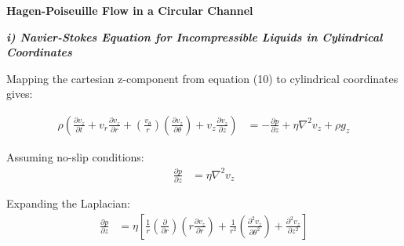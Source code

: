 \documentclass[titlepage]{article}
\begin{document}
\newpage
\begin{center}
    \large
    \textbf{Hagen-Poiseuille Flow in a Circular Channel} \\
\end{center}

\normalsize
\begin{center}
    \textbf{\emph{i) Navier-Stokes Equation for Incompressible Liquids in Cylindrical Coordinates}}
\end{center}

\noindent Mapping the cartesian z-component from equation (10) to cylindrical coordinates gives: 

\begin{align}
    \rho\left(\displaystyle\frac{\partial{v_{z}}}{\partial{t}}+v_{r}\displaystyle\frac{\partial{v_{z}}}{\partial{r}}+\left(\displaystyle\frac{v_{\theta}}{r}\right)\left(\displaystyle\frac{\partial{v_{z}}}{\partial{\theta}}\right)+v_{z}\displaystyle\frac{\partial{v_{z}}}{\partial{z}}\right)&=-\displaystyle\frac{\partial{p}}{\partial{z}}+\eta\nabla^2v_{z}+\rho{g_{z}}
\end{align}

\noindent Assuming no-slip conditions:
\begin{align}    
    \displaystyle\frac{\partial{p}}{\partial{z}}&=\eta\nabla^2v_{z}
\end{align}

\noindent Expanding the Laplacian: 
\begin{align}    
    \displaystyle\frac{\partial{p}}{\partial{z}}&=\eta\left[\displaystyle\frac{1}{r}\left(\displaystyle\frac{\partial}{\partial{r}}\right)\left(r\displaystyle\frac{\partial{v_{z}}}{\partial{r}}\right)+\displaystyle\frac{1}{r^2}\left(\displaystyle\frac{\partial^2{v_{z}}}{\partial{\theta^2}}\right)+\displaystyle\frac{\partial^2{v_{z}}}{\partial{z^2}}\right]
\end{align}
\end{document}
